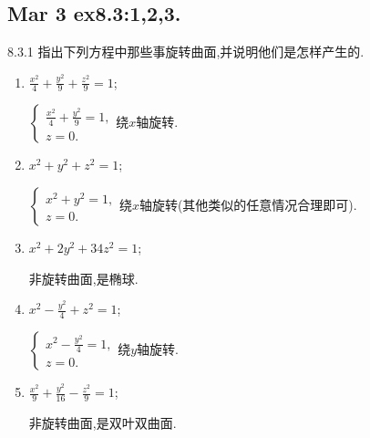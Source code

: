 \setcounter{chapter}{1} %
\chapter{}

\section{Mar 3 ex8.3:1,2,3.}

\begin{exercise}{8.3.1}
    指出下列方程中那些事旋转曲面,并说明他们是怎样产生的.
        \begin{enumerate}
            \item $\frac{x^2}{4}+\frac{y^2}{9}+\frac{z^2}{9}=1$;
        \begin{solution}
        $\begin{cases}
            \frac{x^2}{4}+\frac{y^2}{9}=1,\\
            z=0.
        \end{cases}$绕$x$轴旋转.
        \end{solution}

            \item $x^2+y^2+z^2=1$;
        \begin{solution}
        $\begin{cases}
            x^2+y^2=1,\\
            z=0.
        \end{cases}$绕$x$轴旋转(其他类似的任意情况合理即可).
        \end{solution}

            \item $x^2+2y^2+34z^2=1$;
        \begin{solution}
        非旋转曲面,是椭球.
        \end{solution}
        
            \item $x^2-\frac{y^2}{4}+z^2=1$;
        \begin{solution}
        $\begin{cases}
            x^2-\frac{y^2}{4}=1,\\
            z=0.
        \end{cases}$绕$y$轴旋转.
        \end{solution}

            \item $\frac{x^2}{9}+\frac{y^2}{16}-\frac{z^2}{9}=1$;
        \begin{solution}
            非旋转曲面,是双叶双曲面.
        \end{solution}          


\end{enumerate}
\end{exercise}
